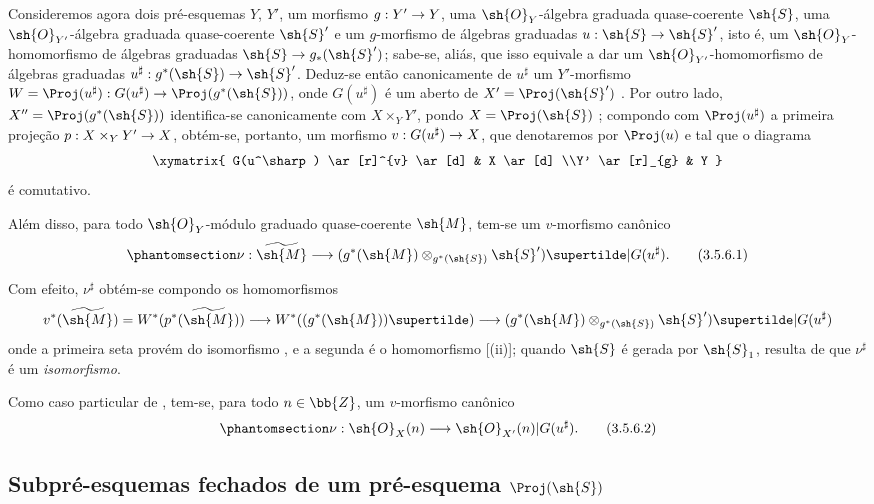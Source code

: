 \documentclass[oneside,10pt]{amsart}
\makeatletter
\newcommand{\ega@arrow}[2]{\mathchoice{#1}{#2}{#2}{#2}}
\renewcommand{\to}{\ega@arrow{\longrightarrow}{\rightarrow}}
\newcommand{\oldpage}[2][]{\marginnote{\normalfont\footnotesize\textbf{#1}~|~#2}\ignorespaces}
\let\EGAOriginalLabel\label
\renewcommand{\label}[1]{\phantomsection\EGAOriginalLabel{#1}}
\makeatother
\begin{document}
\begin{env}[3.5.6]
\label{II.3.5.6}
Consideremos agora dois pré-esquemas $Y$, $Y'$, um morfismo $g:Y'\to Y$, uma $\sh{O}_Y$-álgebra graduada quase-coerente $\sh{S}$, uma $\sh{O}_{Y'}$-álgebra graduada quase-coerente $\sh{S}'$ e um $g$-morfismo de álgebras graduadas $u:\sh{S}\to\sh{S}'$, isto é, um $\sh{O}_Y$-homomorfismo de álgebras graduadas $\sh{S}\to g_*(\sh{S}')$;
sabe-se, aliás, que isso equivale a dar um $\sh{O}_{Y'}$-homomorfismo de álgebras graduadas $u^\sharp:g^*(\sh{S})\to\sh{S}'$.
Deduz-se então canonicamente de $u^\sharp$ um $Y'$-morfismo $W=\Proj(u^\sharp):G(u^\sharp)\to\Proj(g^*(\sh{S}))$, onde $G(u^\sharp)$ é um aberto de $X'=\Proj(\sh{S}')$ .
Por outro lado, $X''=\Proj(g^*(\sh{S}))$ identifica-se
\oldpage[II]{64}
canonicamente com $X\times_Y Y'$, pondo $X=\Proj(\sh{S})$ ;
compondo com $\Proj(u^\sharp)$ a primeira projeção $p:X\times_Y Y'\to X$, obtém-se, portanto, um morfismo $v:G(u^\sharp)\to X$, que denotaremos por $\Proj(u)$ e tal que o diagrama
\[
  \xymatrix{
    G(u^\sharp) \ar[r]^{v} \ar[d]
    & X \ar[d]
  \\Y' \ar[r]_{g}
    & Y
  }
\]
é comutativo.

Além disso, para todo $\sh{O}_Y$-módulo graduado quase-coerente $\sh{M}$, tem-se um $v$-morfismo canônico
\[
\label{II.3.5.6.1}
  \nu:\widetilde{\sh{M}}\to(g^*(\sh{M})\otimes_{g^*(\sh{S})}\sh{S}')\supertilde|G(u^\sharp).
\tag{3.5.6.1}
\]

Com efeito, $\nu^\sharp$ obtém-se compondo os homomorfismos
\[
  v^*(\widetilde{\sh{M}})
  =W^*(p^*(\widetilde{\sh{M}}))
  \to W^*((g^*(\sh{M}))\supertilde)
  \to (g^*(\sh{M})\otimes_{g^*(\sh{S})}\sh{S}')\supertilde|G(u^\sharp)
\]
onde a primeira seta provém do isomorfismo , e a segunda é o homomorfismo [(ii)];
quando $\sh{S}$ é gerada por $\sh{S}_1$, resulta de  que $\nu^\sharp$ é um \emph{isomorfismo}.

Como caso particular de , tem-se, para todo $n\in\bb{Z}$, um $v$-morfismo canônico
\[
\label{II.3.5.6.2}
  \nu:\sh{O}_X(n)\to\sh{O}_{X'}(n)|G(u^\sharp).
\tag{3.5.6.2}
\]
\end{env}

\subsection{Subpré-esquemas fechados de um pré-esquema $\Proj(\sh{S})$}
\label{subsection:II.3.6}
\end{document}
